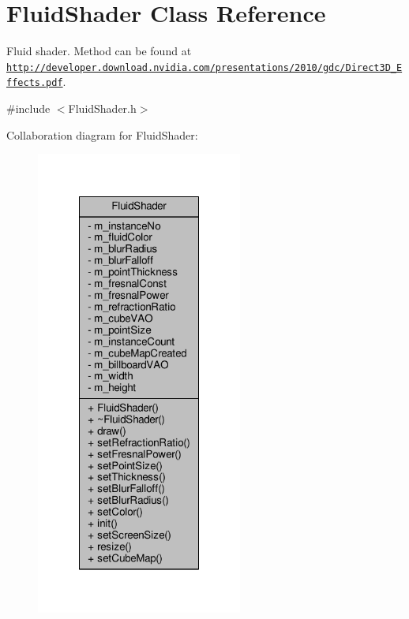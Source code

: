 \hypertarget{class_fluid_shader}{\section{Fluid\-Shader Class Reference}
\label{class_fluid_shader}
}


Fluid shader. Method can be found at \href{http://developer.download.nvidia.com/presentations/2010/gdc/Direct3D_Effects.pdf}{\tt http\-://developer.\-download.\-nvidia.\-com/presentations/2010/gdc/\-Direct3\-D\-\_\-\-Effects.\-pdf}.  




{\ttfamily \#include $<$Fluid\-Shader.\-h$>$}



Collaboration diagram for Fluid\-Shader\-:\nopagebreak
\begin{figure}[H]
\begin{center}
\leavevmode
\includegraphics[width=192pt]{class_fluid_shader__coll__graph}
\end{center}
\end{figure}
